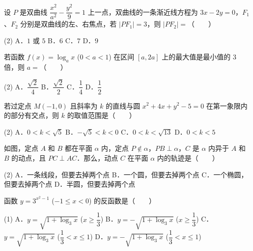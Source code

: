 \begin{question}
设 $P$ 是双曲线 $\dfrac{x^2}{a^2} - \dfrac{y^2}{9} = 1$ 上一点，双曲线的一条渐近线方程为 $3x - 2y = 0$，$F_1$、$F_2$ 分别是双曲线的左、右焦点，若 $|PF_1| = 3$，则 $|PF_2| =$\mbox{（　　）}

\begin{gkopts}(2)
\task A．$1$ 或 $5$
\task B．$6$
\task C．$7$
\task D．$9$
\end{gkopts}

\end{question}
\begin{question}
若函数 $f(x) = \log_a x$ ($0 < a < 1$) 在区间 $[a, 2a]$ 上的最大值是最小值的 3 倍，则 $a =$\mbox{（　　）}

\begin{gkopts}(2)
\task A．$\dfrac{\sqrt{2}}{4}$
\task B．$\dfrac{\sqrt{2}}{2}$
\task C．$\dfrac{1}{4}$
\task D．$\dfrac{1}{2}$
\end{gkopts}

\end{question}
\begin{question}
若过定点 $M(-1, 0)$ 且斜率为 $k$ 的直线与圆 $x^2 + 4x + y^2 - 5 = 0$ 在第一象限内的部分有交点，则 $k$ 的取值范围是\mbox{（　　）}

\begin{gkopts}(2)
\task A．$0 < k < \sqrt{5}$
\task B．$-\sqrt{5} < k < 0$
\task C．$0 < k < \sqrt{13}$
\task D．$0 < k < 5$
\end{gkopts}

\Needspace{0.4\textheight}
\end{question}
\begin{question}
如图，定点 $A$ 和 $B$ 都在平面 $\alpha$ 内，定点 $P \notin \alpha$，$PB \perp \alpha$，$C$ 是 $\alpha$ 内异于 $A$ 和 $B$ 的动点，且 $PC \perp AC$．那么，动点 $C$ 在平面 $\alpha$ 内的轨迹是\mbox{（　　）}
\nopagebreak[4]
\begin{center}\end{center}
\nopagebreak[4]
\begin{gkopts}(2)
\task A．一条线段，但要去掉两个点
\task B．一个圆，但要去掉两个点
\task C．一个椭圆，但要去掉两个点
\task D．半圆，但要去掉两个点
\end{gkopts}

\end{question}
\begin{question}
函数 $y = 3^{x^2 - 1}$ ($-1 \le x < 0$) 的反函数是\mbox{（　　）}

\begin{gkopts}(1)
\task A．$y = \sqrt{1 + \log_3 x}$ ($x \ge \dfrac{1}{3}$)
\task B．$y = -\sqrt{1 + \log_3 x}$ ($x \ge \dfrac{1}{3}$)
\task C．$y = \sqrt{1 + \log_3 x}$ ($\dfrac{1}{3} < x \le 1$)
\task D．$y = -\sqrt{1 + \log_3 x}$ ($\dfrac{1}{3} < x \le 1$)
\end{gkopts}

\end{question}
